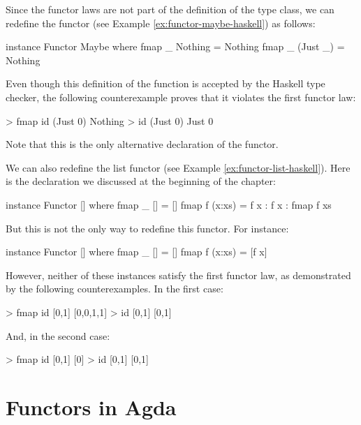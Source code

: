 \begin{example}
  \label{ex:functor-bad-maybe-haskell}

  Since the functor laws are not part of the definition of the
   type class, we can redefine the
   functor (see Example
  \ref{ex:functor-maybe-haskell}) as follows:
  \begin{codehaskell}
instance Functor Maybe where
  fmap _ Nothing  = Nothing
  fmap _ (Just _) = Nothing
  \end{codehaskell}
  Even though this definition of the  function is
  accepted by the Haskell type checker, the following counterexample
  proves that it violates the first functor law:
  \begin{codehaskell}
> fmap id (Just 0)
Nothing
> id (Just 0)
Just 0
  \end{codehaskell}
  Note that this is the only alternative declaration of the
   functor.

\end{example}

\begin{example}
  \label{ex:functor-bad-list-haskell}

   We can also redefine the list functor (see
  Example \ref{ex:functor-list-haskell}). Here is the declaration we
  discussed at the beginning of the chapter:
  \begin{codehaskell}
instance Functor [] where
  fmap _ []     = []
  fmap f (x:xs) = f x : f x : fmap f xs
  \end{codehaskell}
  But this is not the only way to redefine this functor. For instance:
  \begin{codehaskell}
instance Functor [] where
  fmap _ []     = []
  fmap f (x:xs) = [f x]
  \end{codehaskell}
  However, neither of these instances satisfy the first functor law,
  as demonstrated by the following counterexamples. In the first case:
  \begin{codehaskell}
> fmap id [0,1]
[0,0,1,1]
> id [0,1]
[0,1]
  \end{codehaskell}
  And, in the second case:
  \begin{codehaskell}
> fmap id [0,1]
[0]
> id [0,1]
[0,1]
  \end{codehaskell}

\end{example}

\section{Functors in Agda}
\label{sec:functors-agda}

